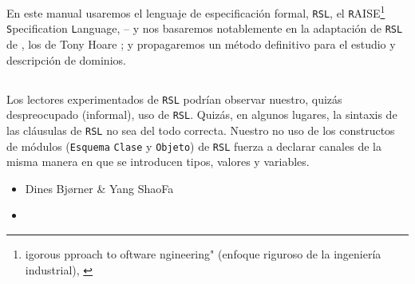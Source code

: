 \treprikker

\noindent
\pind En este manual usaremos
\begynd 
\pind el lenguaje de especificación formal, \texttt{RSL},
\pind el \texttt{R}AISE\footnote{igorous
      pproach \ysfchgii{ }
      to  oftware ngineering" (enfoque riguroso de la ingeniería industrial), %
      \cite{RaiseMethod}} \texttt{S}pecification 
      \texttt{L}anguage, \cite{RSL} -- 
\pind y nos basaremos notablemente en la adaptación de \texttt{RSL} de , los
       de Tony Hoare \citecsp;
\pind y propagaremos un método definitivo para el estudio y
      descripción de dominios.
\afslut
\afslut

\subsection*{} 


\subsection*{}

Los lectores experimentados de \texttt{RSL} \cite{RSL} podrían observar nuestro,
quizás despreocupado (informal), uso de \texttt{RSL}. Quizás, en algunos lugares, la 
sintaxis de las cláusulas de \texttt{RSL} no sea del todo correcta. Nuestro no uso
de los constructos de módulos (\texttt{Esquema}\ysfchg{, } \texttt{Clase} y \texttt{Objeto})
de \texttt{RSL}  fuerza a declarar \textsf{canal}es de la misma manera
en que se introducen \textsf{tipo}s, \textsf{valor}es y \textsf{variable}s.

\begin{itemize}

\item[] \hfill   Dines Bj{\o}rner \& Yang ShaoFa

\item[] \hfill \todaytime
\end{itemize}


